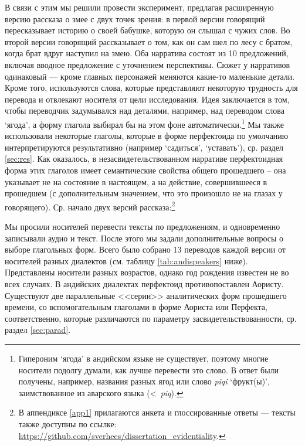 \par В связи с этим мы решили провести эксперимент, предлагая расширенную версию рассказа о змее с двух точек зрения: в первой версии говорящий пересказывает историю о своей бабушке, которую он слышал с чужих слов. Во второй версии говорящий рассказывает о том, как он сам шел по лесу с братом, когда брат вдруг наступил на змею. Оба нарратива состоят из 10 предложений, включая вводное предложение с уточнением перспективы. Сюжет у нарративов одинаковый --- кроме главных персонажей меняются какие-то маленькие детали. Кроме того, используются слова, которые представляют некоторую трудность для перевода и отвлекают носителя от цели исследования. Идея заключается в том, чтобы переводчик задумывался над деталями, например, над переводом слова `ягода', а форму глагола выбирал бы на этом фоне автоматически.\footnote{Гипероним `ягода' в андийском языке не существует, поэтому многие носители подолгу думали, как лучше перевести это слово. В ответ были получены, например, названия разных ягод или слово \textit{piqi} `фрукт(ы)', заимствованное из аварского языка (\textless \textit{~piq}).} Мы также использовали некоторые глаголы, которые в форме перфектоида по умолчанию интерпретируются результативно (например ‘садиться’, ‘уставать’), ср. раздел \ref{sec:res}. Как оказалось, в незасвидетельствованном нарративе перфектоидная форма этих глаголов имеет семантические свойства общего прошедшего – она указывает не на состояние в настоящем, а на действие, совершившееся в прошедшем (с дополнительным значением, что это произошло не на глазах у говорящего). Ср. начало двух версий рассказа:\footnote{В аппендиксе \ref{app1} прилагаются анкета и глоссированные ответы --- тексты также доступны по ссылке: \url{https://github.com/sverhees/dissertation_evidentiality}.}



Мы просили носителей перевести тексты по предложениям, и одновременно записывали аудио и текст. После этого мы задали дополнительные вопросы о выборе глагольных форм. Всего было собрано 13 переводов каждой версии от носителей разных диалектов (см. таблицу \ref{tab:andispeakers} ниже). Представлены носители разных возрастов, однако год рождения известен не во всех случаях. В андийских диалектах перфектоид противопоставлен Аористу. Существуют две параллельные <<серии>> аналитических форм прошедшего времени, со вспомогательным глаголами в форме Аориста или Перфекта, соответственно, которые различаются по параметру засвидетельствованности, ср. раздел \ref{sec:parad}.

